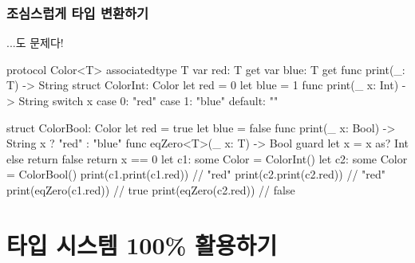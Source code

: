 \documentclass{beamer}
\begin{document}
\begin{frame}[c, fragile]
  \frametitle{조심스럽게 타입 변환하기}

  \begin{minipage}[t]{0.49\linewidth}
    ...도 문제다!
    \begin{swiftcode}
    protocol Color<T> {
      associatedtype T
      var red: T { get }
      var blue: T { get }
      func print(_: T) -> String
    }
    struct ColorInt: Color {
      let red = 0
      let blue = 1
      func print(_ x: Int) -> String {
        switch x {
        case 0: "red"
        case 1: "blue"
        default: ""
        }
      }
    }
    \end{swiftcode}
  \end{minipage}
  \begin{minipage}[t]{0.50\linewidth}
    \begin{swiftcode}
    struct ColorBool: Color {
      let red = true
      let blue = false
      func print(_ x: Bool) -> String {
        x ? "red" : "blue"
      }
    }
    func eqZero<T>(_ x: T) -> Bool {
      guard let x = x as? Int else { return false }
      return x == 0
    }
    let c1: some Color = ColorInt()
    let c2: some Color = ColorBool()
    print(c1.print(c1.red))  // "red"
    print(c2.print(c2.red))  // "red"
    print(eqZero(c1.red))  // true
    print(eqZero(c2.red))  // false
    \end{swiftcode}
  \end{minipage}
\end{frame}


\section{타입 시스템 100\%{} 활용하기}
\end{document}
